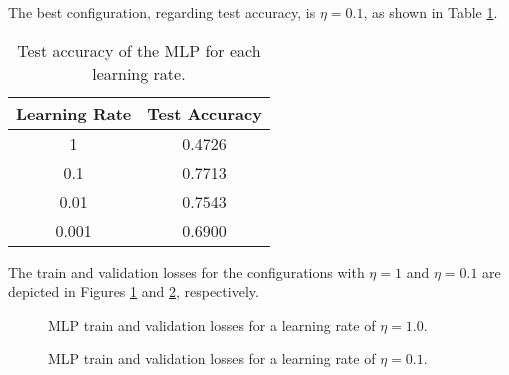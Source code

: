 \documentclass[12pt]{article}
\begin{document}
\begin{enumerate}[leftmargin=\labelsep]
\begin{enumerate}[label=\alph*)]
                    The best configuration, regarding test accuracy, is $\eta = 0.1$, as shown in Table \ref{tab:mlp-learning-rate-accuracy}.

                    \begin{table}[H]
                        \centering
                        \begin{tabular}{|c|c|}
                            \hline
                            \textbf{Learning Rate} & \textbf{Test Accuracy} \\ \hline
                            1                      & 0.4726                 \\ \hline
                            0.1                    & 0.7713                 \\ \hline
                            0.01                   & 0.7543                 \\ \hline
                            0.001                  & 0.6900                 \\ \hline
                        \end{tabular}
                        \caption{Test accuracy of the MLP for each learning rate.}
                        \label{tab:mlp-learning-rate-accuracy}
                    \end{table}

                    The train and validation losses for the configurations with $\eta = 1$ and $\eta = 0.1$ are depicted in Figures \ref{fig:q2-mlp-training-loss-batch-16-lr-1.0-epochs-20-l2-0.0-opt-sgd} and \ref{fig:q2-mlp-training-loss-batch-16-lr-0.1-epochs-20-l2-0.0-opt-sgd}, respectively.

                    \begin{figure}[H]
                        \centering
                        
                        \caption{MLP train and validation losses for a learning rate of $\eta = 1.0$.}
                        \label{fig:q2-mlp-training-loss-batch-16-lr-1.0-epochs-20-l2-0.0-opt-sgd}
                    \end{figure}

                    \begin{figure}[H]
                        \centering
                        
                        \caption{MLP train and validation losses for a learning rate of $\eta = 0.1$.}
                        \label{fig:q2-mlp-training-loss-batch-16-lr-0.1-epochs-20-l2-0.0-opt-sgd}
                    \end{figure}


\end{enumerate}
\end{enumerate}
\end{document}
